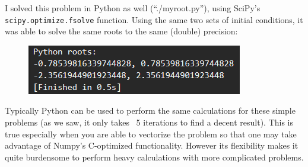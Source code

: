 \documentclass[12pt]{article}
\begin{document}
I solved this problem in Python as well (``./myroot.py''), using SciPy's
\texttt{scipy.optimize.fsolve} function. Using the same two sets of initial
conditions, it was able to solve the same roots to the same (double) precision:
\begin{figure}[H]
    \centering
    \includegraphics[scale=0.6]{python}
    \label{fig:python}
\end{figure}

Typically Python can be used to perform the same calculations for these simple
problems (as we saw, it only takes ~5 iterations to find a decent result). This
is true especially when you are able to vectorize the problem so that one may
take advantage of Numpy's C-optimized functionality. However its flexibility
makes it quite burdensome to perform heavy calculations with more complicated
problems.
\end{document}
